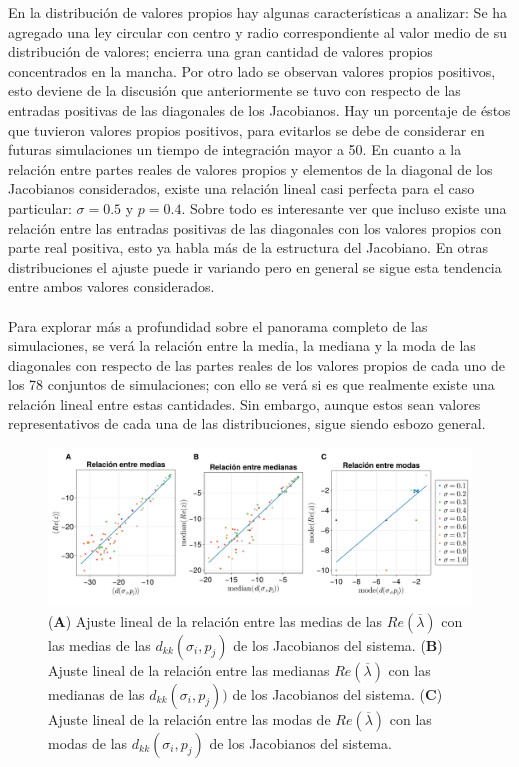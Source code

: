 En la distribución de valores propios hay algunas características a analizar: Se ha agregado una ley circular con centro y radio correspondiente al valor medio de su distribución de valores; encierra una gran cantidad de valores propios concentrados en la mancha. Por otro lado se observan valores propios positivos, esto deviene de la discusión que anteriormente se tuvo con respecto de las entradas positivas de las diagonales de los Jacobianos. Hay un porcentaje de éstos que tuvieron valores propios positivos, para evitarlos se debe de considerar en futuras simulaciones un tiempo de integración mayor a 50. En cuanto a la relación entre partes reales de valores propios y elementos de la diagonal de los Jacobianos considerados, existe una relación lineal casi perfecta para el caso particular: $\sigma=0.5$ y $p=0.4$. Sobre todo es interesante ver que incluso existe una relación entre las entradas positivas de las diagonales con los valores propios con parte real positiva, esto ya habla más de la estructura del Jacobiano. En otras distribuciones el ajuste puede ir variando pero en general se sigue esta tendencia entre ambos valores considerados.\\
\\
Para explorar más a profundidad sobre el panorama completo de las simulaciones, se verá la relación entre la media, la mediana y la moda de las diagonales con respecto de las partes reales de los valores propios de cada uno de los 78 conjuntos de simulaciones; con ello se verá si es que realmente existe una relación lineal entre estas cantidades. Sin embargo, aunque estos sean valores representativos de cada una de las distribuciones, sigue siendo esbozo general.
\begin{figure}[h!]
	\centering
	\includegraphics[scale=0.16]{../Imagenes/AjustesLinMeds}
	\caption{(\textbf{A}) Ajuste lineal de la relación entre las medias de las $Re(\overline{\lambda})$ con las medias de las $d_{kk}(\sigma_i,p_j)$ de los Jacobianos del sistema. (\textbf{B}) Ajuste lineal de la relación entre las medianas $Re(\overline{\lambda})$ con las medianas de las $d_{kk}(\sigma_i,p_j))$ de los Jacobianos del sistema. (\textbf{C}) Ajuste lineal de la relación entre las modas de $Re(\overline{\lambda})$ con las modas de las $d_{kk}(\sigma_i,p_j)$ de los Jacobianos del sistema.}
	\label{fig:AjustesLinMeds}
\end{figure}

